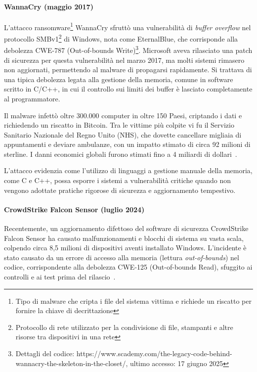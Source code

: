 \paragraph{WannaCry (maggio 2017)}

L'attacco ransomware\footnote{Tipo di malware che cripta i file del sistema
vittima e richiede un riscatto per fornire la chiave di decrittazione} WannaCry
sfruttò una vulnerabilità di \textit{buffer overflow} nel protocollo SMBv1\footnote{Protocollo
di rete utilizzato per la condivisione di file, stampanti e altre risorse tra dispositivi
in una rete} di Windows, nota come EternalBlue, che corrisponde alla debolezza
CWE-787 (Out-of-bounds Write)\footnote{Dettagli del codice: https://www.scademy.com/the-legacy-code-behind-wannacry-the-skeleton-in-the-closet/,
ultimo accesso: 17 giugno 2025}. Microsoft aveva rilasciato una patch di
sicurezza per questa vulnerabilità nel marzo 2017, ma molti sistemi rimasero non
aggiornati, permettendo al malware di propagarsi rapidamente. Si trattava di una
tipica debolezza legata alla gestione della memoria, comune in software scritto
in C/C++, in cui il controllo sui limiti dei buffer è lasciato completamente al programmatore.

Il malware infettò oltre 300.000 computer in oltre 150 Paesi, criptando i dati e
richiedendo un riscatto in Bitcoin. Tra le vittime più colpite vi fu il Servizio
Sanitario Nazionale del Regno Unito (NHS), che dovette cancellare migliaia di
appuntamenti e deviare ambulanze, con un impatto stimato di circa 92 milioni di sterline.
I danni economici globali furono stimati fino a 4 miliardi di dollari~\cite{wannacry_kaspersky}.

L'attacco evidenzia come l'utilizzo di linguaggi a gestione manuale della
memoria, come C e C++, possa esporre i sistemi a vulnerabilità critiche quando
non vengono adottate pratiche rigorose di sicurezza e aggiornamento tempestivo.

\paragraph{CrowdStrike Falcon Sensor (luglio 2024)}

Recentemente, un aggiornamento difettoso del software di sicurezza CrowdStrike Falcon
Sensor ha causato malfunzionamenti e blocchi di sistema su vasta scala, colpendo
circa 8,5 milioni di dispositivi aventi installato Windows. L'incidente è stato causato
da un errore di accesso alla memoria (lettura \textit{out-of-bounds}) nel codice,
corrispondente alla debolezza CWE-125 (Out-of-bounds Read), sfuggito ai
controlli e ai test prima del rilascio~\cite{crowdstrike2024incident}.

